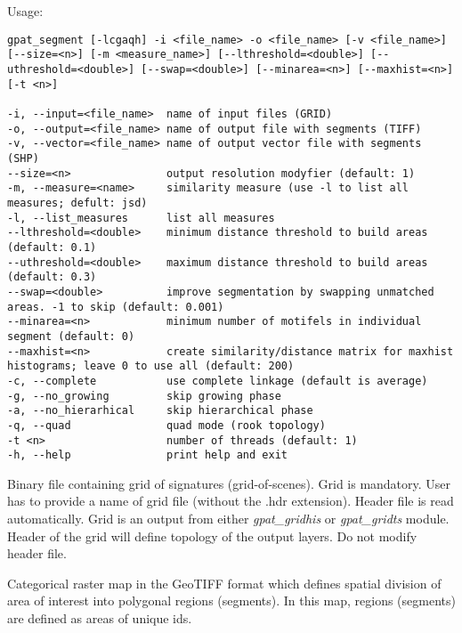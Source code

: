 {}
\\\\
Usage:

\begin{minipage}{\linewidth}
\begin{lstlisting}
gpat_segment [-lcgaqh] -i <file_name> -o <file_name> [-v <file_name>] [--size=<n>] [-m <measure_name>] [--lthreshold=<double>] [--uthreshold=<double>] [--swap=<double>] [--minarea=<n>] [--maxhist=<n>] [-t <n>]

-i, --input=<file_name>  name of input files (GRID)
-o, --output=<file_name> name of output file with segments (TIFF)
-v, --vector=<file_name> name of output vector file with segments (SHP)
--size=<n>               output resolution modyfier (default: 1)
-m, --measure=<name>     similarity measure (use -l to list all measures; defult: jsd)
-l, --list_measures      list all measures
--lthreshold=<double>    minimum distance threshold to build areas (default: 0.1)
--uthreshold=<double>    maximum distance threshold to build areas (default: 0.3)
--swap=<double>          improve segmentation by swapping unmatched areas. -1 to skip (default: 0.001)
--minarea=<n>            minimum number of motifels in individual segment (default: 0)
--maxhist=<n>            create similarity/distance matrix for maxhist histograms; leave 0 to use all (default: 200)
-c, --complete           use complete linkage (default is average)
-g, --no_growing         skip growing phase
-a, --no_hierarhical     skip hierarchical phase
-q, --quad               quad mode (rook topology)
-t <n>                   number of threads (default: 1)
-h, --help               print help and exit
\end{lstlisting}
\end{minipage}


Binary file containing grid of signatures (grid-of-scenes). 
Grid is mandatory. 
User has to provide a name of grid file (without the .hdr extension). 
Header file is read automatically. 
Grid is an output from either {\it gpat\_gridhis} or {\it gpat\_gridts} module. 
Header of the grid will define topology of the output layers. 
Do not modify header file.


Categorical raster map in the GeoTIFF format which defines spatial division of area of interest into polygonal regions (segments).
In this map, regions (segments) are defined as areas of unique ids.


